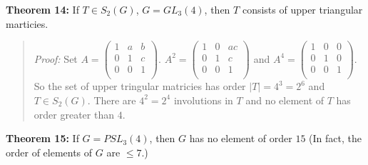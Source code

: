 {\bf Theorem 14:} If $T \in S_2(G)$, $G = GL_3(4)$, then $T$ consists of upper triangular marticies.
\begin{quote}
\emph{Proof:}
Set
$A=
\left(
\begin{array} {ccc}
1 & a & b \\
0 & 1 & c \\
0 & 0 & 1 \\
\end{array}
\right)
$.
$A^2=
\left(
\begin{array} {ccc}
1 & 0 & ac \\
0 & 1 & c \\
0 & 0 & 1 \\
\end{array}
\right)
$ and
$A^4=
\left(
\begin{array} {ccc}
1 & 0 & 0 \\
0 & 1 & 0 \\
0 & 0 & 1 \\
\end{array}
\right)$. So the set of upper tringular matricies has order $|T|=4^3=2^6$ and  $T \in S_2(G)$.
There are $4^2=2^4$ involutions in $T$ and no element of $T$ has order greater than $4$.
\end{quote}
{\bf Theorem 15:} If $G = PSL_3(4)$, then $G$ has no element of order $15$ (In fact, the order of elements
of $G$ are $\leq 7$.)
